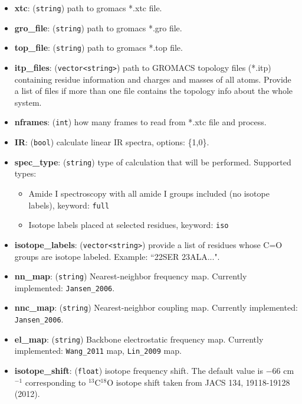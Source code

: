 \documentclass{article}
\begin{document}
\begin{itemize}

\item \textbf{xtc}: (\texttt{string}) path to gromacs *.xtc file.
\item \textbf{gro\_file}: (\texttt{string}) path to gromacs *.gro file.
\item \textbf{top\_file}: (\texttt{string}) path to gromacs *.top file.
\item \textbf{itp\_files}: (\texttt{vector<string>}) path to GROMACS topology files (*.itp) containing residue information and charges and masses of all atoms. Provide a list of files if more than one file contains the topology info about the whole system.
\item \textbf{nframes}: (\texttt{int}) how many frames to read from *.xtc file and process.
\item \textbf{IR}: (\texttt{bool}) calculate linear IR spectra, options: \{1,0\}.
\item \textbf{spec\_type}: (\texttt{string}) type of calculation that will be performed. Supported types:
\begin{itemize}
\item Amide I spectroscopy with all amide I groups included (no isotope labels), keyword: \texttt{full}
\item Isotope labels placed at selected residues, keyword: \texttt{iso}
\end{itemize}
\item \textbf{isotope\_labels}: (\texttt{vector<string>}) provide a list of residues whose C=O groups are isotope labeled. Example: ``22SER 23ALA...".
\item \textbf{nn\_map}: (\texttt{string}) Nearest-neighbor frequency map. Currently implemented: \texttt{Jansen\_2006}.
\item \textbf{nnc\_map}: (\texttt{string}) Nearest-neighbor coupling map. Currently implemented: \texttt{Jansen\_2006}.
\item \textbf{el\_map}: (\texttt{string}) Backbone electrostatic frequency map. Currently implemented: \texttt{Wang\_2011} map, \texttt{Lin\_2009} map.
\item \textbf{isotope\_shift}: (\texttt{float}) isotope frequency shift. The default value is $-$66 cm$^{-1}$ corresponding to $^{13}$C$^{18}$O isotope shift
taken from JACS 134, 19118-19128 (2012).
\end{itemize}
\end{document}
